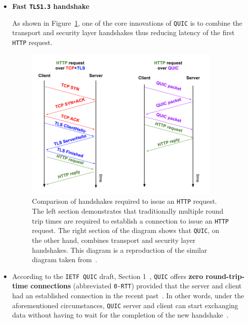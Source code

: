 \documentclass[12pt,a4paper,twoside,openright]{report}
\begin{document}
\begin{itemize}
\item \textbf{Fast \texttt{TLS1.3} handshake}

As shown in Figure~\ref{fig:QUIC_handshake_vs_TCP-TLS_handshake}, one of the core innovations of \texttt{QUIC} is to combine the transport and security layer handshakes thus reducing latency of the first \texttt{HTTP} request.


     \begin{figure}[H]
    \centering
    \includegraphics[width=0.9\textwidth]{figs/QUIC_handshake_vs_TCP-TLS_handshake.png}
    \caption[Comparison of handshakes required to issue an \texttt{HTTP} request]{Comparison of handshakes required to issue an \texttt{HTTP} request. The left section demonstrates that traditionally multiple round trip times are required to establish a connection to issue an \texttt{HTTP} request. The right section of the diagram shows that \texttt{QUIC}, on the other hand, combines transport and security layer handshakes. This diagram is a reproduction of the similar diagram taken from~\cite{the-road-to-quic}.}
    \label{fig:QUIC_handshake_vs_TCP-TLS_handshake}
    \end{figure}
 
 

  \item 
    According to the \texttt{IETF QUIC} draft, Section 1~\cite{ietf-quic-transport-draft-32}, \texttt{QUIC} offers \textbf{zero round-trip-time connections} (abbreviated \texttt{0-RTT}) provided that the server and client had an established connection in the recent past~\cite{introducing-0-rtt}.
    In other words, under the aforementioned circumstances, \texttt{QUIC} server and client can start exchanging data without having to wait for the completion of the new handshake~\cite{ietf-quic-transport-draft-32}.
  

\end{itemize}
\end{document}
